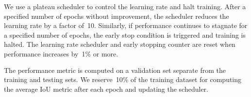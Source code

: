 We use a plateau scheduler to control the learning rate and halt training. After a specified number of epochs without improvement, the scheduler reduces the learning rate by a factor of~10. Similarly, if performance continues to stagnate for a specified number of epochs, the early stop condition is triggered and training is halted. The learning rate scheduler and early stopping counter are reset when performance increases by~1\% or more.

The performance metric is computed on a validation set separate from the training and testing sets. We reserve~10\% of the training dataset for computing the average IoU metric after each epoch and updating the scheduler.